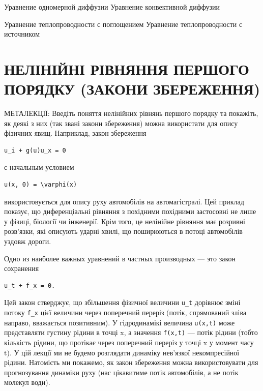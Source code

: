 \documentclass[
  ukrainian,
]{article}
\begin{document}
Уравнение одномерной диффузии Уравнение конвективной диффузии

Уравнение теплопроводности с поглощением Уравнение теплопроводности с
источником

\section{НЕЛІНІЙНІ РІВНЯННЯ ПЕРШОГО ПОРЯДКУ (ЗАКОНИ
ЗБЕРЕЖЕННЯ)}\label{ux43dux435ux43bux456ux43dux456ux439ux43dux456-ux440ux456ux432ux43dux44fux43dux43dux44f-ux43fux435ux440ux448ux43eux433ux43e-ux43fux43eux440ux44fux434ux43aux443-ux437ux430ux43aux43eux43dux438-ux437ux431ux435ux440ux435ux436ux435ux43dux43dux44f}

МЕТАЛЕКЦІЇ: Введіть поняття нелінійних рівнянь першого порядку та
покажіть, як деякі з них (так звані закони збереження) можна використати
для опису фізичних явищ. Наприклад, закон збереження

\begin{verbatim}
u_i + g(u)u_x = 0
\end{verbatim}

с начальным условием

\begin{verbatim}
u(x, 0) = \varphi(x)
\end{verbatim}

використовується для опису руху автомобілів на автомагістралі. Цей
приклад показує, що диференціальні рівняння з похідними похідними
застосовні не лише у фізиці, біології чи інженерії. Крім того, це
нелінійне рівняння має розривні розв'язки, які описують ударні хвилі, що
поширюються в потоці автомобілів уздовж дороги.

Одно из наиболее важных уравнений в частных производных --- это закон
сохранения

\begin{verbatim}
u_t + f_x = 0.
\end{verbatim}

Цей закон стверджує, що збільшення фізичної величини \texttt{u\_t}
дорівнює зміні потоку \texttt{f\_x} цієї величини через поперечний
переріз (потік, спрямований зліва направо, вважається позитивним). У
гідродинамікі величина \texttt{u(x,t)} може представляти густину рідини
в точці x, а значення \texttt{f(x,t)} --- потік рідини (тобто кількість
рідини, що протікає через поперечний переріз у точці x у момент часу t).
У цій лекції ми не будемо розглядати динаміку нев'язкої некомпресійної
рідини. Натомість ми покажемо, як закон збереження можна використовувати
для прогнозування динаміки руху (нас цікавитиме потік автомобілів, а не
потік молекул води).
\end{document}
